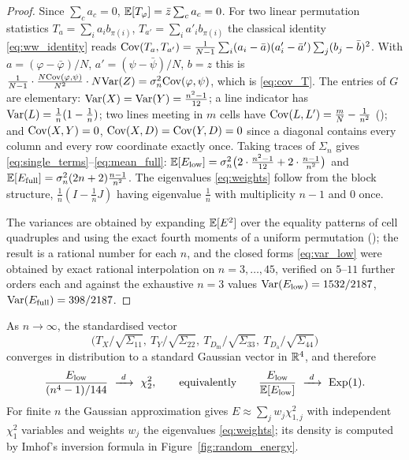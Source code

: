 \begin{proof}
Since $\sum_c a_c=0$, $\mathbb{E}[T_\varphi]=\bar z\sum_c a_c=0$. For two linear permutation
statistics $T_a=\sum_i a_i b_{\pi(i)}$, $T_{a'}=\sum_i a'_i b_{\pi(i)}$ the classical identity
\eqref{eq:ww_identity} reads
$\mathrm{Cov}(T_a,T_{a'})=\frac{1}{N-1}\sum_i(a_i-\bar a)(a'_i-\bar a')\sum_j(b_j-\bar b)^2$.
With $a=(\varphi-\bar\varphi)/N$, $a'=(\psi-\bar\psi)/N$, $b=z$ this is
$\frac{1}{N-1}\cdot\frac{N\mathrm{Cov}(\varphi,\psi)}{N^2}\cdot N\mathrm{Var}(Z)=\sigma_n^2\mathrm{Cov}(\varphi,\psi)$,
which is \eqref{eq:cov_T}. The entries of $G$ are elementary: $\mathrm{Var}(X)=\mathrm{Var}(Y)=\frac{n^2-1}{12}$; a line
indicator has $\mathrm{Var}(L)=\frac1n(1-\frac1n)$; two lines meeting in $m$ cells have $\mathrm{Cov}(L,L')=\frac{m}{N}-\frac{1}{n^2}$
(); and $\mathrm{Cov}(X,Y)=0$, $\mathrm{Cov}(X,D)=\mathrm{Cov}(Y,D)=0$ since a diagonal contains every column and every row
coordinate exactly once.  Taking traces of $\Sigma_n$ gives \eqref{eq:single_terms}--\eqref{eq:mean_full}:
$\mathbb{E}[E_{\mathrm{low}}]=\sigma_n^2\big(2\cdot\frac{n^2-1}{12}+2\cdot\frac{n-1}{n^2}\big)$ and
$\mathbb{E}[E_{\mathrm{full}}]=\sigma_n^2(2n+2)\frac{n-1}{n^2}$. The eigenvalues
\eqref{eq:weights} follow from the block structure, $\tfrac1n(I-\tfrac1nJ)$ having eigenvalue
$\tfrac1n$ with multiplicity $n-1$ and $0$ once.

The variances are obtained by expanding $\mathbb{E}[E^2]$ over the equality patterns of cell quadruples and
using the exact fourth moments of a uniform permutation (); the result is a rational number
for each $n$, and the closed forms \eqref{eq:var_low} were obtained by exact rational interpolation on
$n=3,\dots,45$, verified on $5$--$11$ further orders each and against the exhaustive $n=3$ values
$\mathrm{Var}(E_{\mathrm{low}})=1532/2187$, $\mathrm{Var}(E_{\mathrm{full}})=398/2187$.
\end{proof}

\begin{corollary}
\label{cor:random_energy_clt}
As $n\to\infty$, the standardised vector
\[
\bigl(T_X/\sqrt{\Sigma_{11}},\ T_Y/\sqrt{\Sigma_{22}},\ T_{D_{\mathrm{m}}}/\sqrt{\Sigma_{33}},\ T_{D_{\mathrm{a}}}/\sqrt{\Sigma_{44}}\bigr)
\]
converges in distribution to a standard Gaussian vector in $\mathbb{R}^4$, and therefore
\begin{equation}
\frac{\Elow}{(n^4-1)/144}\ \xrightarrow{\ d\ }\ \chi^2_2,
\qquad\text{equivalently}\qquad
\frac{\Elow}{\E[\Elow]}\ \xrightarrow{\ d\ }\ \mathrm{Exp}(1).
\label{eq:low_limit}
\end{equation}
For finite $n$ the Gaussian approximation gives $E\approx\sum_j w_j\chi^2_{1,j}$ with independent
$\chi^2_1$ variables and weights $w_j$ the eigenvalues \eqref{eq:weights}; its density is computed by
Imhof's inversion formula \cite{imhof1961} in Figure~\ref{fig:random_energy}.
\end{corollary}

